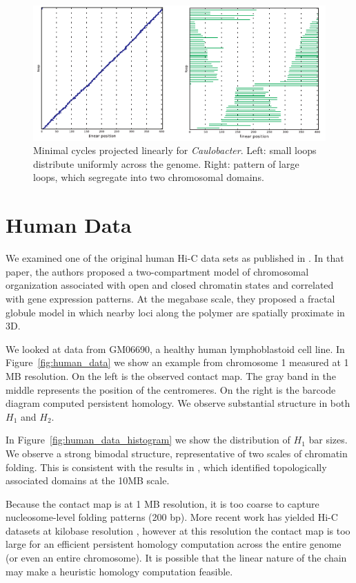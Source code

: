 \begin{figure}
       \centering
       \includegraphics[width=\columnwidth]{./fig/caulobacter_localized_loops.pdf}
       \caption{Minimal cycles projected linearly for \emph{Caulobacter}. Left: small loops distribute uniformly across the genome. Right: pattern of large loops, which segregate into two chromosomal domains.}
       \label{fig:caulobacter_bar_sizes}
\end{figure}

\section{Human Data}
\label{sec:human_data}
%
We examined one of the original human Hi-C data sets as published in \cite{LiebermanAiden:2009jz}.
In that paper, the authors proposed a two-compartment model of chromosomal organization associated with open and closed chromatin states and correlated with gene expression patterns.
At the megabase scale, they proposed a fractal globule model in which nearby loci along the polymer are spatially proximate in 3D.

We looked at data from GM06690, a healthy human lymphoblastoid cell line.
In Figure~\ref{fig:human_data} we show an example from chromosome 1 measured at 1 MB resolution.
On the left is the observed contact map.
The gray band in the middle represents the position of the centromeres.
On the right is the barcode diagram computed persistent homology.
We observe substantial structure in both $H_1$ and $H_2$.

In Figure~\ref{fig:human_data_histogram} we show the distribution of $H_1$ bar sizes.
We observe a strong bimodal structure, representative of two scales of chromatin folding.
This is consistent with the results in \cite{LiebermanAiden:2009jz}, which identified topologically associated domains at the 10MB scale.

Because the contact map is at 1 MB resolution, it is too coarse to capture nucleosome-level folding patterns (200 bp).
More recent work has yielded Hi-C datasets at kilobase resolution \cite{Jin:2013hm,Rao:2014eo}, however at this resolution the contact map is too large for an efficient persistent homology computation across the entire genome (or even an entire chromosome).
It is possible that the linear nature of the chain may make a heuristic homology computation feasible.


